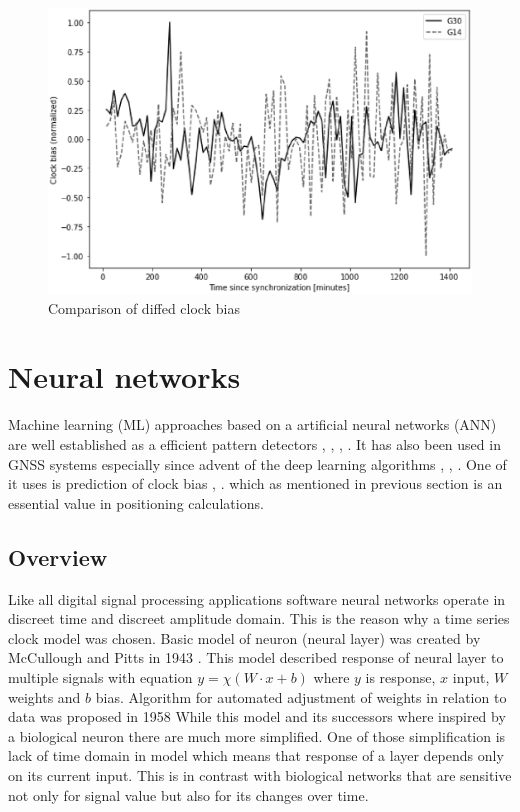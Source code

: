 \documentclass{kybernetika}
\begin{document}
\begin{figure}[htb] 
\centering
	\includegraphics[width=\textwidth]{figures/bias_normalized}
\caption{Comparison of diffed clock bias}
\label{fig:diffed_shifts}
\end{figure}

\FloatBarrier
\section{Neural networks}
Machine learning (ML) approaches based on a artificial neural networks (ANN) are
well established as a efficient pattern detectors \cite{Abiodun2019}, \cite{Faraway2008},
\cite{Khan2019}, \cite{Miller1993}.
It has also been used in GNSS systems especially since advent of the deep learning
algorithms \cite{Kim2019}, \cite{Perez2019}, \cite{Wei2016}.
One of it uses is prediction of clock bias  \cite{Indriyatmoko2008}, \cite{Wang2017}.
which as mentioned in previous section is an essential value in positioning calculations.

\subsection{Overview}  
Like all digital signal processing applications software neural networks operate in
discreet time and discreet amplitude domain. This is the reason why a time series clock model
was chosen. Basic model of neuron (neural layer) was created by McCullough and Pitts in 1943
\cite{McCulloch1943}. This model described response of neural layer to multiple signals with
equation $y= \chi (W\cdot x+b)$ where $y$ is response, $x$ input, $W$ weights and $b$ bias.
Algorithm for automated adjustment of weights in relation to data was proposed in 1958
While this model and its successors where inspired by a biological neuron there are much
more simplified. One of those simplification is lack of time domain in model which means
that response of a layer depends only on its current input.
This is in contrast with biological networks that are sensitive not only for signal value
but also for its changes over time.
\end{document}
